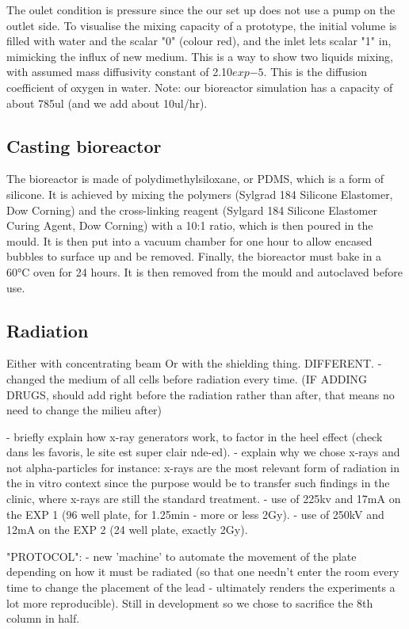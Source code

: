 \documentclass[onecolumn,10pt]{asme2ej}
\begin{document}
 The oulet condition is pressure since the our set up does not use a pump on the outlet side. To visualise the mixing capacity of a prototype, the initial volume is filled with water and the scalar "0" (colour red), and the inlet lets scalar "1" in, mimicking the influx of new medium. This is a way to show two liquids mixing, with assumed mass diffusivity constant of 2.10$exp{-5}$. This is the diffusion coefficient of oxygen in water. 
 Note: our bioreactor simulation has a capacity of about 785ul (and we add about 10ul/hr).

\subsection{Casting bioreactor}
The bioreactor is made of polydimethylsiloxane, or PDMS, which is a form of silicone. It is achieved by mixing the polymers (Sylgrad 184 Silicone Elastomer, Dow Corning) and the cross-linking reagent (Sylgard 184 Silicone Elastomer Curing Agent, Dow Corning) with a 10:1 ratio, which is then poured in the mould. It is then put into a vacuum chamber for one hour to allow encased bubbles to surface up and be removed. Finally, the bioreactor must bake in a 60°C oven for 24 hours. It is then removed from the mould and autoclaved before use. 

\subsection{Radiation}
Either with concentrating beam
Or with the shielding thing. DIFFERENT. 
- changed the medium of all cells before radiation every time. (IF ADDING DRUGS, should add right before the radiation rather than after, that means no need to change the milieu after)

- briefly explain how x-ray generators work, to factor in the heel effect (check dans les favoris, le site est super clair nde-ed). 
- explain why we chose x-rays and not alpha-particles for instance: x-rays are the most relevant form of radiation in the in vitro context since the purpose would be to transfer such findings in the clinic, where x-rays are still the standard treatment.
- use of 225kv and 17mA on the EXP 1 (96 well plate, for 1.25min - more or less 2Gy).
- use of 250kV and 12mA on the EXP 2 (24 well plate, exactly 2Gy).

"PROTOCOL":
- new 'machine' to automate the movement of the plate depending on how it must be radiated (so that one needn't enter the room every time to change the placement of the lead - ultimately renders the experiments a lot more reproducible). Still in development so we chose to sacrifice the 8th column in half. 
\end{document}
